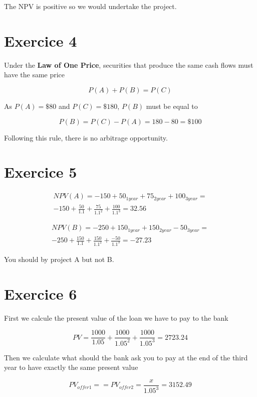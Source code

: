 \documentclass[a4paper,11pt,twoside]{article}
\def \be {\begin{equation}}
\def \ee {\end{equation}}
\begin{document}
The NPV is positive so we would undertake the project.

\section{Exercice 4}

Under the {\bf Law of One Price}, securities that produce the same cash flows must have the same price

\be
P(A) + P(B) = P(C)
\ee

As $P(A) = \$ 80$ and $P(C) = \$ 180$, $P(B)$ must be equal to 

\be
P(B) = P(C) - P(A) = 180 - 80 = \$100
\ee

Following this rule, there is no arbitrage opportunity.

\section{Exercice 5}

\begin{multline}
NPV(A) = -150 + 50_{1year} + 75_{2year} + 100_{3year} = \\ -150 + \frac{50}{1.1} + \frac{75}{1.1^2}+ \frac{100}{1.1^3} = 32.56
\end{multline}

\begin{multline}
NPV(B) = -250 + 150_{1year} + 150_{2year} - 50_{3year} = \\ -250 + \frac{150}{1.1} + \frac{150}{1.1^2}+ \frac{-50}{1.1^3} = -27.23
\end{multline}

You should by project A but not B.

\section{Exercice 6}

First we calcule the present value of the loan we have to pay to the bank

\be
PV = \frac{1000}{1.05} + \frac{1000}{1.05^2} + \frac{1000}{1.05^3} = 2723.24
\ee

Then we calculate what should the bank ask you to pay at the end of the third year to have exactly the same present value

\be
 PV_{offer 1} == PV_{offer 2} = \frac{x}{1.05^3} = 3152.49
 \ee
 
\end{document}
